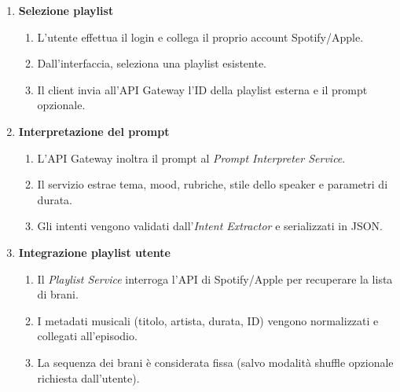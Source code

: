 \documentclass[11pt,a4paper]{article}
\begin{document}
\begin{enumerate}
    \item \textbf{Selezione playlist}
    \begin{enumerate}
        \item L'utente effettua il login e collega il proprio account Spotify/Apple.
        \item Dall'interfaccia, seleziona una playlist esistente.
        \item Il client invia all'API Gateway l'ID della playlist esterna e il prompt opzionale.
    \end{enumerate}

    \item \textbf{Interpretazione del prompt}
    \begin{enumerate}
        \item L'API Gateway inoltra il prompt al \textit{Prompt Interpreter Service}.
        \item Il servizio estrae tema, mood, rubriche, stile dello speaker e parametri di durata.
        \item Gli intenti vengono validati dall'\textit{Intent Extractor} e serializzati in JSON.
    \end{enumerate}

    \item \textbf{Integrazione playlist utente}
    \begin{enumerate}
        \item Il \textit{Playlist Service} interroga l'API di Spotify/Apple per recuperare la lista di brani.
        \item I metadati musicali (titolo, artista, durata, ID) vengono normalizzati e collegati all'episodio.
        \item La sequenza dei brani è considerata fissa (salvo modalità shuffle opzionale richiesta dall'utente).
    \end{enumerate}


\end{enumerate}
\end{document}
